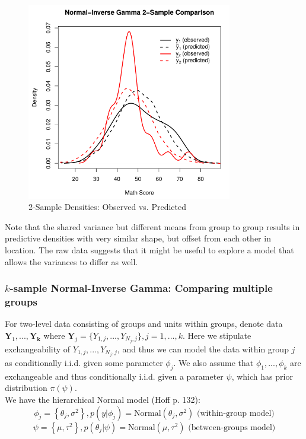 \documentclass[12pt, a4paper]{article}
\begin{document}
\begin{figure}[ht]
  \centering
  \includegraphics[width=0.8\textwidth]{./Graphics/ExamplePlots/NormIG2_Data_v_Prediction}
  \caption{2-Sample Densities: Observed vs. Predicted}
  \label{fig:NormIG2_DvP}
\end{figure}


\noindent Note that the shared variance but different means from group to group results in predictive densities with very similar shape, but offset from each other in location.  The raw data suggests that it might be useful to explore a model that allows the variances to differ as well.\\

    \subsubsection{$k$-sample Normal-Inverse Gamma:  Comparing multiple groups}

    For two-level data consisting of groups and units within groups, denote data $\mathbf{Y}_1,...,\mathbf{Y_k}$ where $\mathbf{Y}_j = \{Y_{1,j},...,Y_{N_j,j}\}, j=1,...,k$. Here we stipulate exchangeability of $Y_{1,j},...,Y_{N_j,j}$, and thus we can model the data within group $j$ as conditionally i.i.d. given some parameter $\phi_j$.  We also assume that $\phi_1,...,\phi_k$ are exchangeable and thus conditionally i.i.d. given a parameter $\psi$, which has prior distribution $\pi(\psi)$.\\

\noindent We have the hierarchical Normal model (Hoff p. 132):
    $$\phi_j = \left\{\theta_j,\sigma^2\right\}, p\left(y|\phi_j\right) = \text{Normal}\left(\theta_j,\sigma^2\right) \text{ (within-group model)}$$
    $$\psi = \left\{\mu,\tau^2\right\}, p\left(\theta_j|\psi\right) = \text{Normal}\left(\mu,\tau^2\right) \text{ (between-groups model)}$$
\end{document}
